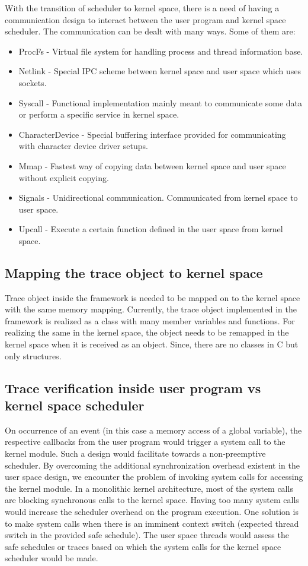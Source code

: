 With the transition of scheduler to kernel space, there is a need of having a communication design to interact between the user program and kernel space scheduler. 
The communication can be dealt with many ways. 
Some of them are:

\begin{itemize}
\item ProcFs - Virtual file system for handling process and thread information base.
\item Netlink - Special IPC scheme between kernel space and user space which uses sockets.
\item Syscall - Functional implementation mainly meant to communicate some data or perform a specific service in kernel space. 
\item CharacterDevice - Special buffering interface provided for communicating with character device driver setups.
\item Mmap - Fastest way of copying data between kernel space and user space without explicit copying.
\item Signals - Unidirectional communication. Communicated from kernel space to user space. 
\item Upcall - Execute a certain function defined in the user space from kernel space.

\end{itemize}

\subsection{Mapping the trace object to kernel space}

Trace object inside the framework is needed to be mapped on to the kernel space with the same memory mapping. 
Currently, the trace object implemented in the framework is realized as a class with many member variables and functions. 
For realizing the same in the kernel space, the object needs to be remapped in the kernel space when it is received as an object. 
Since, there are no classes in C but only structures.

\subsection{Trace verification inside user program vs kernel space scheduler}

On occurrence of an event (in this case a memory access of a global variable), the respective callbacks from the user program would trigger a system call to the kernel module. 
Such a design would facilitate towards a non-preemptive scheduler. 
By overcoming the additional synchronization overhead existent in the user space design, we encounter the problem of invoking system calls for accessing the kernel module. 
In a monolithic kernel architecture, most of the system calls are blocking synchronous calls to the kernel space. 
Having too many system calls would increase the scheduler overhead on the program execution. 
One solution is to make system calls when there is an imminent context switch (expected thread switch in the provided safe schedule). 
The user space threads would assess the safe schedules or traces based on which the system calls for the kernel space scheduler would be made. 

